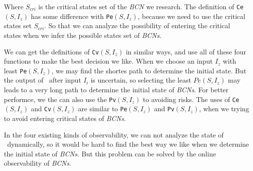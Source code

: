 Where $S_{cri}$ is the critical states set of the {\em BCN} we research. The definition of {\tt Ce}$(S, I_z)$ has some difference with {\tt Pe}$(S, I_z)$, because we need to use the critical states set $S_{cri}$. So that  we can analyze the possibility of entering the  critical states when we infer the possible states set of {\em BCNs}.

We can get the definitions of {\tt Cv}$(S, I_z)$ in similar ways, and use all of these four functions to make the best decision we like. When we choose an input $I_z$ with least {\tt Pe}$(S, I_z)$, we may find the shortes path to determine the initial state. But the output of \BCNs\ after input $I_i$ is uncertain, so selecting the least $Pe(S, I_z)$ may leads to a very long path to determine the initial state of {\em BCNs}. For better performce, we the can also use the {\tt Pv}$(S, I_z)$ to avoiding risks. The uses of {\tt Ce}$(S, I_z)$ and {\tt Cv}$(S, I_z)$ are similar to {\tt Pe}$(S, I_z)$ and {\tt Pv}$(S, I_z)$, when we trying to avoid entering critical states of {\em BCNs}.

In the four existing kinds of observability, we can not analyze the state of \BCNs\ dynamically, so it would be hard to find the best way we like when we determine the initial state of {\em BCNs}. But this problem can be solved by the online observability of {\em BCNs}.